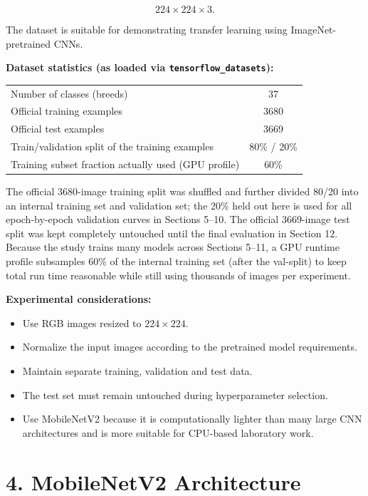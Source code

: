 \documentclass[10pt]{article}
\begin{document}
\[
224\times224\times3.
\]

The dataset is suitable for demonstrating transfer learning using
ImageNet-pretrained CNNs.

\textbf{Dataset statistics (as loaded via \texttt{tensorflow\_datasets}):}

\begin{center}
\begin{tabular}{|l|c|}
\hline
Number of classes (breeds) & 37\\
Official training examples & 3680\\
Official test examples & 3669\\
Train/validation split of the training examples & 80\% / 20\%\\
Training subset fraction actually used (GPU profile) & 60\%\\
\hline
\end{tabular}
\end{center}

The official 3680-image training split was shuffled and further divided
80/20 into an internal training set and validation set; the 20\% held
out here is used for all epoch-by-epoch validation curves in Sections
5--10. The official 3669-image test split was kept completely untouched
until the final evaluation in Section 12. Because the study trains many
models across Sections 5--11, a GPU runtime profile subsamples 60\% of
the internal training set (after the val-split) to keep total run time
reasonable while still using thousands of images per experiment.

\textbf{Experimental considerations:}

\begin{itemize}
\item Use RGB images resized to $224\times224$.
\item Normalize the input images according to the pretrained model requirements.
\item Maintain separate training, validation and test data.
\item The test set must remain untouched during hyperparameter selection.
\item Use MobileNetV2 because it is computationally lighter than many
large CNN architectures and is more suitable for CPU-based laboratory work.
\end{itemize}

\section*{4. MobileNetV2 Architecture}
\end{document}
